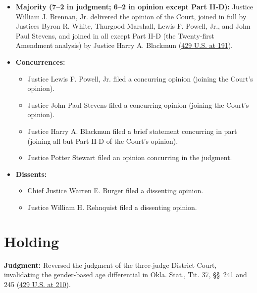 \documentclass[12pt]{article}
\begin{document}
\begin{itemize}
  \item \textbf{Majority (7--2 in judgment; 6--2 in opinion except Part II-D):} Justice William J. Brennan, Jr. delivered the opinion of the Court, joined in full by Justices Byron R. White, Thurgood Marshall, Lewis F. Powell, Jr., and John Paul Stevens, and joined in all except Part II-D (the Twenty-first Amendment analysis) by Justice Harry A. Blackmun (\href{https://supreme.justia.com/cases/federal/us/429/190/}{429 U.S. at 191}).
  \item \textbf{Concurrences:}
    \begin{itemize}
      \item Justice Lewis F. Powell, Jr. filed a concurring opinion (joining the Court's opinion).
      \item Justice John Paul Stevens filed a concurring opinion (joining the Court's opinion).
      \item Justice Harry A. Blackmun filed a brief statement concurring in part (joining all but Part II-D of the Court's opinion).
      \item Justice Potter Stewart filed an opinion concurring in the judgment.
    \end{itemize}
  \item \textbf{Dissents:}
    \begin{itemize}
      \item Chief Justice Warren E. Burger filed a dissenting opinion.
      \item Justice William H. Rehnquist filed a dissenting opinion.
    \end{itemize}
\end{itemize}

\section{Holding}

\textbf{Judgment:} Reversed the judgment of the three-judge District Court, invalidating the gender-based age differential in Okla. Stat., Tit. 37, \S\S\ 241 and 245 (\href{https://supreme.justia.com/cases/federal/us/429/190/}{429 U.S. at 210}).
\end{document}
